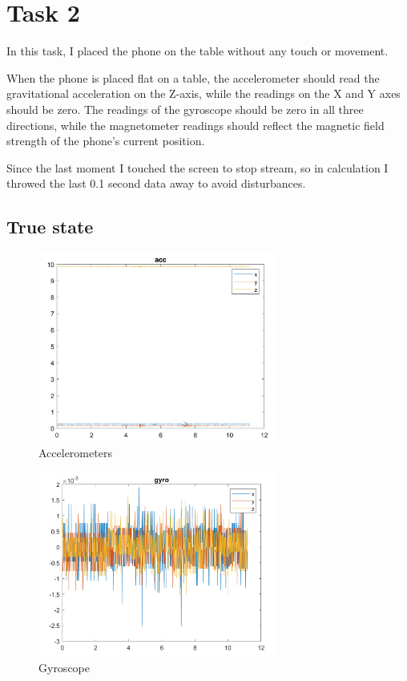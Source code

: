 \section{Task 2}

In this task, I placed the phone on the table without any touch or movement. 

When the phone is placed flat on a table, the accelerometer should read the gravitational acceleration on the Z-axis, while the readings on the X and Y axes should be zero.
The readings of the gyroscope should be zero in all three directions, while the magnetometer readings should reflect the magnetic field strength of the phone's current position.

Since the last moment I touched the screen to stop stream, so in calculation I throwed the last 0.1 second data away to avoid disturbances.

\subsection{True state}

\begin{figure}[H]
 \centering
 \includegraphics[width=0.7\textwidth]{images/acc.png}
 \caption{Accelerometers}
 \label{acc}
\end{figure}

\begin{figure}[H]
 \centering
 \includegraphics[width=0.7\textwidth]{images/gyroscope.png}
 \caption{Gyroscope}
 \label{gyro}
\end{figure}

